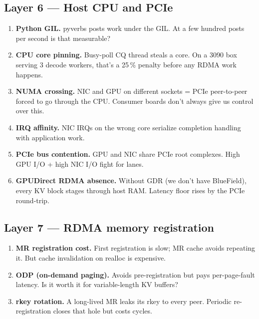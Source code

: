 \documentclass[11pt]{article}
\begin{document}
\subsection*{Layer 6 --- Host CPU and PCIe}
\begin{enumerate}[resume]
\item \textbf{Python GIL.} pyverbs posts work under the GIL. At a
few hundred posts per second is that measurable?
\item \textbf{CPU core pinning.} Busy-poll CQ thread steals a core.
On a 3090 box serving 3 decode workers, that's a 25\,\% penalty
before any RDMA work happens.
\item \textbf{NUMA crossing.} NIC and GPU on different sockets = PCIe
peer-to-peer forced to go through the CPU. Consumer boards don't
always give us control over this.
\item \textbf{IRQ affinity.} NIC IRQs on the wrong core serialize
completion handling with application work.
\item \textbf{PCIe bus contention.} GPU and NIC share PCIe root
complexes. High GPU I/O + high NIC I/O fight for lanes.
\item \textbf{GPUDirect RDMA absence.} Without GDR (we don't have
BlueField), every KV block stages through host RAM. Latency floor
rises by the PCIe round-trip.
\end{enumerate}

\subsection*{Layer 7 --- RDMA memory registration}
\begin{enumerate}[resume]
\item \textbf{MR registration cost.} First registration is slow; MR
cache avoids repeating it. But cache invalidation on realloc is
expensive.
\item \textbf{ODP (on-demand paging).} Avoids pre-registration but
pays per-page-fault latency. Is it worth it for variable-length
KV buffers?
\item \textbf{rkey rotation.} A long-lived MR leaks its rkey to every
peer. Periodic re-registration closes that hole but costs cycles.
\end{enumerate}
\end{document}
